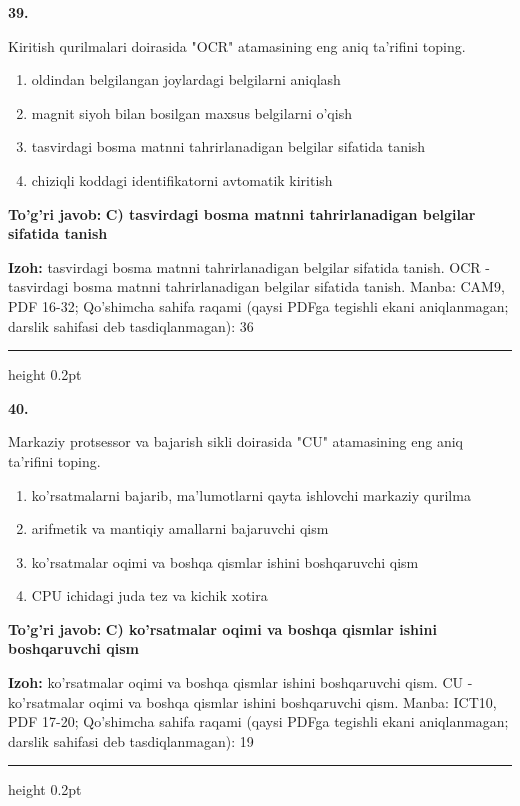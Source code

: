 \documentclass[10pt,a4paper]{article}
\begin{document}
{\bfseries\sffamily\color{ink} 39.}
\par
Kiritish qurilmalari doirasida "OCR" atamasining eng aniq ta'rifini toping.
\begin{enumerate}[label=\Alph*),leftmargin=9mm]
\item oldindan belgilangan joylardagi belgilarni aniqlash
\item magnit siyoh bilan bosilgan maxsus belgilarni o'qish
\item tasvirdagi bosma matnni tahrirlanadigan belgilar sifatida tanish
\item chiziqli koddagi identifikatorni avtomatik kiritish
\end{enumerate}
\begin{tcolorbox}[enhanced,breakable,colback=teal!4,colframe=teal!60!black,boxrule=0.45pt,arc=1.2mm,left=2.7mm,right=2.7mm,top=1.8mm,bottom=1.8mm,before skip=2mm,after skip=2mm]
{\bfseries\sffamily\color{teal}To'g'ri javob:} \textbf{C) tasvirdagi bosma matnni tahrirlanadigan belgilar sifatida tanish}
\par\smallskip
{\bfseries Izoh:} tasvirdagi bosma matnni tahrirlanadigan belgilar sifatida tanish. OCR - tasvirdagi bosma matnni tahrirlanadigan belgilar sifatida tanish. Manba: CAM9, PDF 16-32; Qo'shimcha sahifa raqami (qaysi PDFga tegishli ekani aniqlanmagan; darslik sahifasi deb tasdiqlanmagan): 36
\end{tcolorbox}
\vspace{2mm}\hrule height 0.2pt\vspace{3mm}

{\bfseries\sffamily\color{ink} 40.}
\par
Markaziy protsessor va bajarish sikli doirasida "CU" atamasining eng aniq ta'rifini toping.
\begin{enumerate}[label=\Alph*),leftmargin=9mm]
\item ko'rsatmalarni bajarib, ma'lumotlarni qayta ishlovchi markaziy qurilma
\item arifmetik va mantiqiy amallarni bajaruvchi qism
\item ko'rsatmalar oqimi va boshqa qismlar ishini boshqaruvchi qism
\item CPU ichidagi juda tez va kichik xotira
\end{enumerate}
\begin{tcolorbox}[enhanced,breakable,colback=teal!4,colframe=teal!60!black,boxrule=0.45pt,arc=1.2mm,left=2.7mm,right=2.7mm,top=1.8mm,bottom=1.8mm,before skip=2mm,after skip=2mm]
{\bfseries\sffamily\color{teal}To'g'ri javob:} \textbf{C) ko'rsatmalar oqimi va boshqa qismlar ishini boshqaruvchi qism}
\par\smallskip
{\bfseries Izoh:} ko'rsatmalar oqimi va boshqa qismlar ishini boshqaruvchi qism. CU - ko'rsatmalar oqimi va boshqa qismlar ishini boshqaruvchi qism. Manba: ICT10, PDF 17-20; Qo'shimcha sahifa raqami (qaysi PDFga tegishli ekani aniqlanmagan; darslik sahifasi deb tasdiqlanmagan): 19
\end{tcolorbox}
\vspace{2mm}\hrule height 0.2pt\vspace{3mm}
\end{document}
